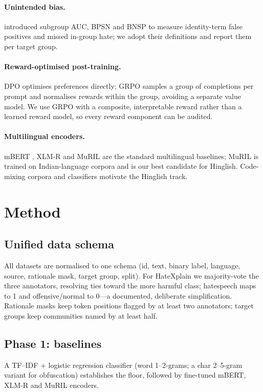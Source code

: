\documentclass[11pt]{article}
\begin{document}
\paragraph{Unintended bias.} \citet{borkan2019nuanced} introduced subgroup
AUC, BPSN and BNSP to measure identity-term false positives and missed
in-group hate; we adopt their definitions and report them per target group.

\paragraph{Reward-optimised post-training.} DPO \citep{rafailov2023dpo}
optimises preferences directly; GRPO \citep{shao2024deepseekmath} samples a
group of completions per prompt and normalises rewards within the group,
avoiding a separate value model. We use GRPO with a composite,
interpretable reward rather than a learned reward model, so every reward
component can be audited.

\paragraph{Multilingual encoders.} mBERT \citep{devlin2019bert}, XLM-R
\citep{conneau2020xlmr} and MuRIL \citep{khanuja2021muril} are the standard
multilingual baselines; MuRIL is trained on Indian-language corpora and is
our best candidate for Hinglish. Code-mixing corpora and classifiers
\citep{bohra2018dataset} motivate the Hinglish track.

\section{Method}
\label{sec:method}
\subsection{Unified data schema}
All datasets are normalised to one schema (id, text, binary label,
language, source, rationale mask, target group, split). For HateXplain we
majority-vote the three annotators, resolving ties toward the more harmful
class; hatespeech maps to 1 and offensive/normal to 0---a documented,
deliberate simplification. Rationale masks keep token positions flagged by
at least two annotators; target groups keep communities named by at least
half.

\subsection{Phase 1: baselines}
A TF--IDF + logistic regression classifier (word 1--2-grams; a char
2--5-gram variant for obfuscation) establishes the floor, followed by
fine-tuned mBERT, XLM-R and MuRIL encoders.
\end{document}
